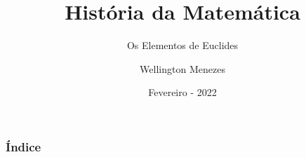 \documentclass[serif]{beamer}
\title{História da Matemática}
\subtitle{Os Elementos de Euclides}
\author{Wellington Menezes}
\institute[]{Instituto Federal de Ciência e Tecnologia do Ceará - IFCE}
\date{Fevereiro - 2022}
\begin{document}
\frame{\titlepage}
\begin{frame}
    \frametitle{Índice}
    \tableofcontents
\end{frame}


\end{document}
